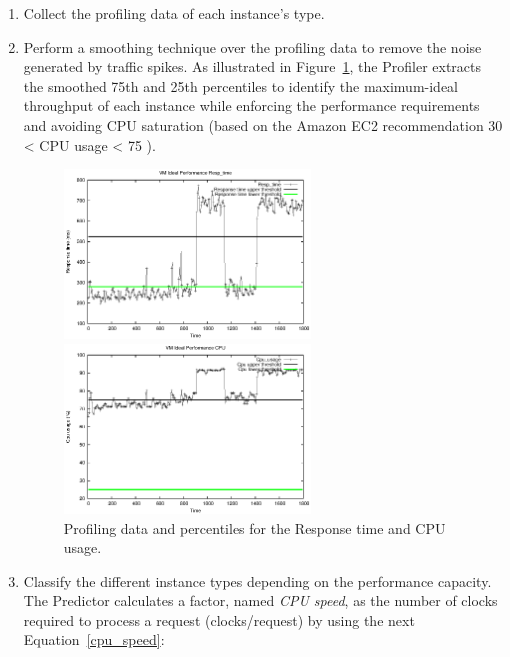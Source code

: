 \begin{enumerate}
\item Collect the profiling data of each instance's type.
\item Perform a smoothing technique over the profiling data to remove the noise generated by traffic spikes. As illustrated in Figure~\ref{fig:vm_performance}, the Profiler extracts the smoothed 75th and 25th percentiles to identify the maximum-ideal  throughput of each instance while enforcing the performance requirements and avoiding CPU saturation (based on the Amazon EC2 recommendation 30 < CPU usage < 75  ).

\begin{figure}[htb]
	\begin{minipage}[b]{0.45\linewidth}
		\includegraphics[height=4.5cm]{images/vm_performance_resp.eps}
		\vspace{-4mm}
	\end{minipage}
	\hfill
	\begin{minipage}[b]{0.45\linewidth}
		\includegraphics[height=4.5cm]{images/vm_performance_cpu.eps}
		\vspace{-4mm}
	\end{minipage}
\caption{Profiling data and percentiles for the Response time and CPU usage.}
\label{fig:vm_performance}
\end{figure}


\item Classify the different instance types depending on the performance capacity. The Predictor calculates a factor, named \emph{CPU speed}, as the number of clocks required to process a request (clocks/request) by using the next Equation~\ref{cpu_speed}:


\end{enumerate}
